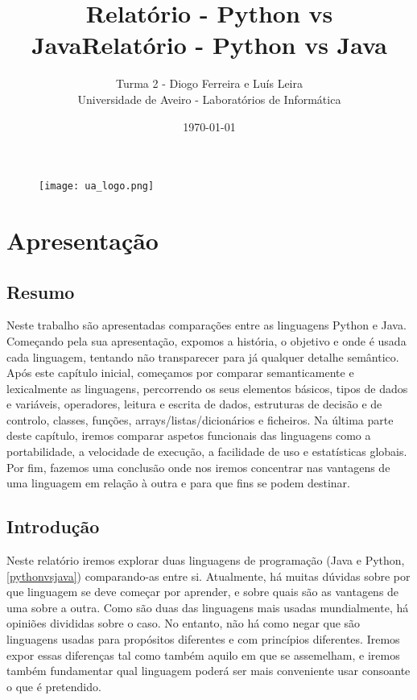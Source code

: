 \documentclass[11pt,openright,twoside]{report}
\title{\textbf{Relatório - Python vs Java}}
\begin{document}
\begin{titlepage}
\begin{figure}
\title{\textbf{Relatório - Python vs Java}}
\author{Turma 2 - Diogo Ferreira e Luís Leira\\\vspace{3cm}
Universidade de Aveiro - Laboratórios de Informática}
\date{\today}
 \texttt{[image: ua\_logo.png]}
\end{figure}
\end{titlepage}

\maketitle
\tableofcontents
\listoffigures

\part{Apresentação}

\chapter{Resumo}
Neste trabalho são apresentadas comparações entre as linguagens Python e Java. Começando pela sua apresentação, expomos a história, o objetivo e onde é usada cada linguagem, tentando não transparecer para já qualquer detalhe semântico. Após este capítulo inicial, começamos por comparar semanticamente e lexicalmente as linguagens, percorrendo os seus elementos básicos, tipos de dados e variáveis, operadores, leitura e escrita de dados, estruturas de decisão e de controlo, classes, funções, arrays/listas/dicionários e ficheiros. Na última parte deste capítulo, iremos comparar aspetos funcionais das linguagens como a portabilidade, a velocidade de execução, a facilidade de uso e estatísticas globais. Por fim, fazemos uma conclusão onde nos iremos concentrar nas vantagens de uma linguagem em relação à outra e para que fins se podem destinar.

\chapter{Introdução}
Neste relatório iremos explorar duas linguagens de programação (Java e Python, \autoref{pythonvsjava}) comparando-as entre si. Atualmente, há muitas dúvidas sobre por que linguagem se deve começar por aprender, e sobre quais são as vantagens de uma sobre a outra. Como são duas das linguagens mais usadas mundialmente, há opiniões divididas sobre o caso.
No entanto, não há como negar que são linguagens usadas para propósitos diferentes e com princípios diferentes. Iremos expor essas diferenças tal como também aquilo em que se assemelham, e iremos também fundamentar qual linguagem poderá ser mais conveniente usar consoante o que é pretendido.
\end{document}
